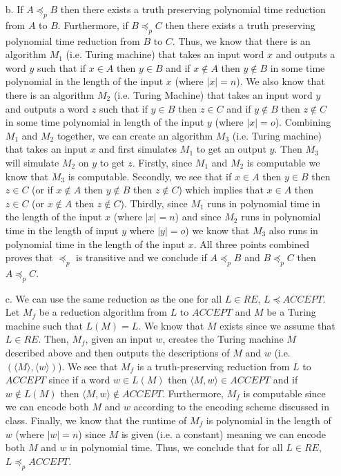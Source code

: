 \documentclass [10pt]{article}
\newcommand{\reduces}{\preceq}%
\begin{document}
\begin{enumerate}
\begin{enumerate}
		\item[b.]If $A\reduces_{p}B$ then there exists a truth preserving polynomial time reduction from $A$ to $B$. Furthermore, if $B\reduces_{p}C$ then there exists a truth preserving polynomial time reduction from $B$ to $C$. Thus, we know that there is an algorithm $M_{1}$ (i.e. Turing machine) that takes an input word $x$ and outputs a word $y$ such that if $x\in A$ then $y\in B$ and if $x\notin A$ then $y\notin B$ in some time polynomial in the length of the input $x$ (where $\left|x\right|=n$). We also know that there is an algorithm $M_{2}$ (i.e. Turing Machine) that takes an input word $y$ and outputs a word $z$ such that if $y\in B$ then $z\in C$ and if $y\notin B$ then $z\notin C$ in some time polynomial in length of the input $y$ (where $\left|x\right|=o$). Combining $M_{1}$ and $M_{2}$ together, we can create an algorithm $M_{3}$ (i.e. Turing machine) that takes an input $x$ and first simulates $M_{1}$ to get an output $y$. Then $M_{3}$ will simulate $M_{2}$ on $y$ to get $z$. Firstly, since $M_{1}$ and $M_{2}$ is computable we know that $M_{3}$ is computable. Secondly, we see that if $x\in A$ then $y\in B$ then $z\in C$ (or if $x\notin A$ then $y\notin B$ then $z\notin C$) which implies that $x\in A$ then $z\in C$ (or $x\notin A$ then $z\notin C$). Thirdly, since $M_{1}$ runs in polynomial time in the length of the input $x$ (where $\left|x\right|=n$) and since $M_{2}$ runs in polynomial time in the length of input $y$ where $\left|y\right|=o$) we know that $M_{3}$ also runs in polynomial time in the length of the input $x$. All three points combined proves that $\reduces_{p}$ is transitive and we conclude if $A\reduces_{p}B$ and $B\reduces_{p}C$ then $A\reduces_{p}C$.
		\item[c.]We can use the same reduction as the one for all $L\in RE$, $L\reduces ACCEPT$. Let $M_{f}$ be a reduction algorithm from $L$ to $ACCEPT$ and $M$ be a Turing machine such that $L(M)=L$. We know that $M$ exists since we assume that $L\in RE$. Then, $M_{f}$, given an input $w$, creates the Turing machine $M$ described above and then outputs the descriptions of $M$ and $w$ (i.e. $(\langle M\rangle,\langle w\rangle)$). We see that $M_{f}$ is a truth-preserving reduction from $L$ to $ACCEPT$ since if a word $w\in L(M)$ then $\langle M, w\rangle\in ACCEPT$ and if $w\notin L(M)$ then $\langle M, w\rangle\notin ACCEPT$. Furthermore, $M_{f}$ is computable since we can encode both $M$ and $w$ according to the encoding scheme discussed in class. Finally, we know that the runtime of $M_{f}$ is polynomial in the length of $w$ (where $\left|w\right|=n$) since $M$ is given (i.e. a constant) meaning we can encode both $M$ and $w$ in polynomial time. Thus, we conclude that for all $L\in RE$, $L\reduces_{p} ACCEPT$.

\end{enumerate}
\end{enumerate}
\end{document}
